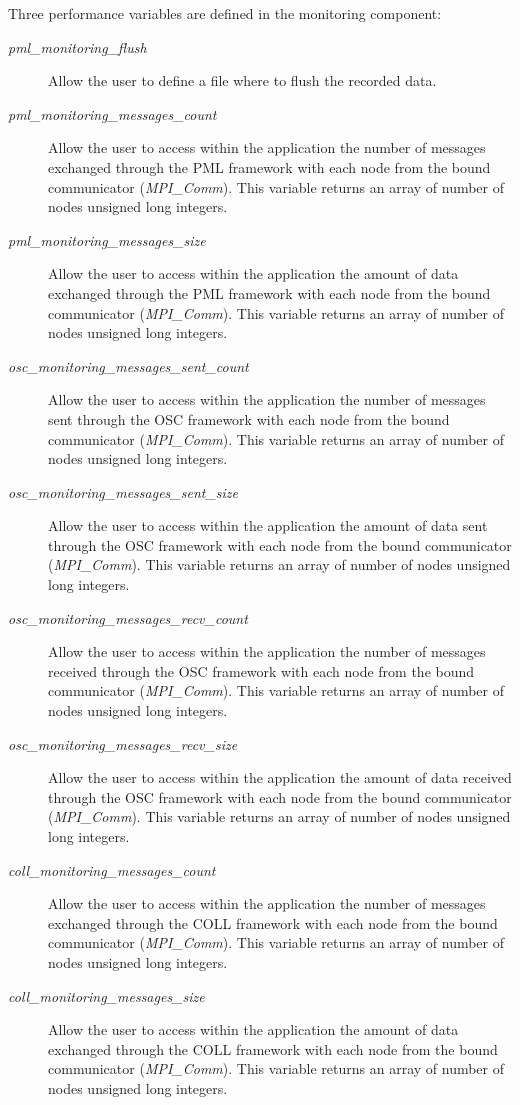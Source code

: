 \documentclass[notitlepage]{article}
\begin{document}
Three performance variables are defined in the monitoring component:
\begin{description}
\item [\textit{pml\_monitoring\_flush}] Allow the user to define a
  file where to flush the recorded data.
\item [\textit{pml\_monitoring\_messages\_count}] Allow the user to
  access within the application the number of messages exchanged
  through the PML framework with each node from the bound communicator
  (\textit{MPI\_Comm}). This variable returns an array of number of
  nodes unsigned long integers.
\item [\textit{pml\_monitoring\_messages\_size}] Allow the user to
  access within the application the amount of data exchanged through
  the PML framework with each node from the bound communicator
  (\textit{MPI\_Comm}). This variable returns an array of number of
  nodes unsigned long integers.
\item [\textit{osc\_monitoring\_messages\_sent\_count}] Allow the user to
  access within the application the number of messages sent
  through the OSC framework with each node from the bound communicator
  (\textit{MPI\_Comm}). This variable returns an array of number of
  nodes unsigned long integers.
\item [\textit{osc\_monitoring\_messages\_sent\_size}] Allow the user to
  access within the application the amount of data sent through
  the OSC framework with each node from the bound communicator
  (\textit{MPI\_Comm}). This variable returns an array of number of
  nodes unsigned long integers.
  \item [\textit{osc\_monitoring\_messages\_recv\_count}] Allow the user to
  access within the application the number of messages received
  through the OSC framework with each node from the bound communicator
  (\textit{MPI\_Comm}). This variable returns an array of number of
  nodes unsigned long integers.
\item [\textit{osc\_monitoring\_messages\_recv\_size}] Allow the user to
  access within the application the amount of data received through
  the OSC framework with each node from the bound communicator
  (\textit{MPI\_Comm}). This variable returns an array of number of
  nodes unsigned long integers.
\item [\textit{coll\_monitoring\_messages\_count}] Allow the user to
  access within the application the number of messages exchanged
  through the COLL framework with each node from the bound communicator
  (\textit{MPI\_Comm}). This variable returns an array of number of
  nodes unsigned long integers.
\item [\textit{coll\_monitoring\_messages\_size}] Allow the user to
  access within the application the amount of data exchanged through
  the COLL framework with each node from the bound communicator
  (\textit{MPI\_Comm}). This variable returns an array of number of
  nodes unsigned long integers.
\end{description}
\end{document}
